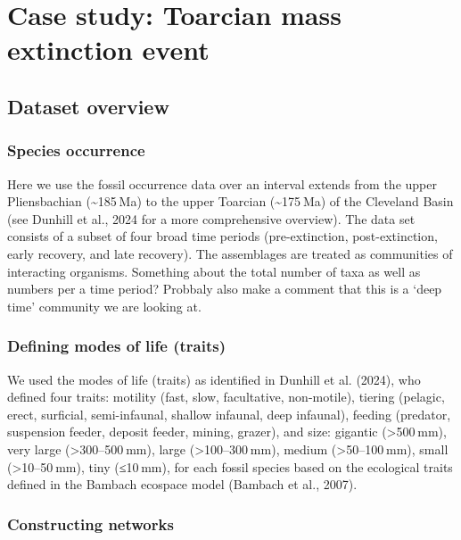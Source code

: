 \documentclass[
]{article}
\begin{document}
\section{Case study: Toarcian mass extinction
event}\label{case-study-toarcian-mass-extinction-event}

\subsection{Dataset overview}\label{dataset-overview}

\subsubsection{Species occurrence}\label{species-occurrence}

Here we use the fossil occurrence data over an interval extends from the
upper Pliensbachian (\textasciitilde185 Ma) to the upper Toarcian
(\textasciitilde175 Ma) of the Cleveland Basin (see Dunhill et al., 2024
for a more comprehensive overview). The data set consists of a subset of
four broad time periods (pre-extinction, post-extinction, early
recovery, and late recovery). The assemblages are treated as communities
of interacting organisms. Something about the total number of taxa as
well as numbers per a time period? Probbaly also make a comment that
this is a `deep time' community we are looking at.

\subsubsection{Defining modes of life
(traits)}\label{defining-modes-of-life-traits}

We used the modes of life (traits) as identified in Dunhill et al.
(2024), who defined four traits: motility (fast, slow, facultative,
non-motile), tiering (pelagic, erect, surficial, semi-infaunal, shallow
infaunal, deep infaunal), feeding (predator, suspension feeder, deposit
feeder, mining, grazer), and size: gigantic (\textgreater500 mm), very
large (\textgreater300--500 mm), large (\textgreater100--300 mm), medium
(\textgreater50--100 mm), small (\textgreater10--50 mm), tiny (≤10 mm),
for each fossil species based on the ecological traits defined in the
Bambach ecospace model (Bambach et al., 2007).

\subsubsection{Constructing networks}\label{constructing-networks}
\end{document}
